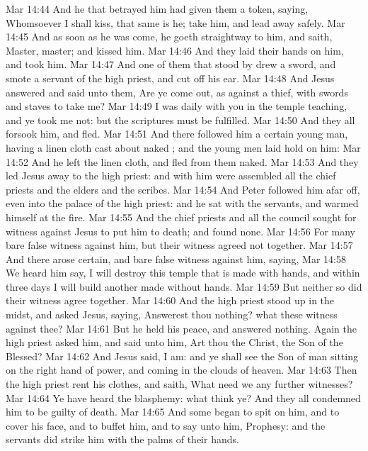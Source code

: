 \vs Mar 14:44 And he that betrayed him had given them a token, saying, Whomsoever I shall kiss, that same is he; take him, and lead  away safely.
\vs Mar 14:45 And as soon as he was come, he goeth straightway to him, and saith, Master, master; and kissed him.
\vs Mar 14:46 And they laid their hands on him, and took him.
\vs Mar 14:47 And one of them that stood by drew a sword, and smote a servant of the high priest, and cut off his ear.
\vs Mar 14:48 And Jesus answered and said unto them, Are ye come out, as against a thief, with swords and  staves to take me?
\vs Mar 14:49 I was daily with you in the temple teaching, and ye took me not: but the scriptures must be fulfilled.
\vs Mar 14:50 And they all forsook him, and fled.
\vs Mar 14:51 And there followed him a certain young man, having a linen cloth cast about  naked ; and the young men laid hold on him:
\vs Mar 14:52 And he left the linen cloth, and fled from them naked.
\vs Mar 14:53 And they led Jesus away to the high priest: and with him were assembled all the chief priests and the elders and the scribes.
\vs Mar 14:54 And Peter followed him afar off, even into the palace of the high priest: and he sat with the servants, and warmed himself at the fire.
\vs Mar 14:55 And the chief priests and all the council sought for witness against Jesus to put him to death; and found none.
\vs Mar 14:56 For many bare false witness against him, but their witness agreed not together.
\vs Mar 14:57 And there arose certain, and bare false witness against him, saying,
\vs Mar 14:58 We heard him say, I will destroy this temple that is made with hands, and within three days I will build another made without hands.
\vs Mar 14:59 But neither so did their witness agree together.
\vs Mar 14:60 And the high priest stood up in the midst, and asked Jesus, saying, Answerest thou nothing? what  these witness against thee?
\vs Mar 14:61 But he held his peace, and answered nothing. Again the high priest asked him, and said unto him, Art thou the Christ, the Son of the Blessed?
\vs Mar 14:62 And Jesus said, I am: and ye shall see the Son of man sitting on the right hand of power, and coming in the clouds of heaven.
\vs Mar 14:63 Then the high priest rent his clothes, and saith, What need we any further witnesses?
\vs Mar 14:64 Ye have heard the blasphemy: what think ye? And they all condemned him to be guilty of death.
\vs Mar 14:65 And some began to spit on him, and to cover his face, and to buffet him, and to say unto him, Prophesy: and the servants did strike him with the palms of their hands.
